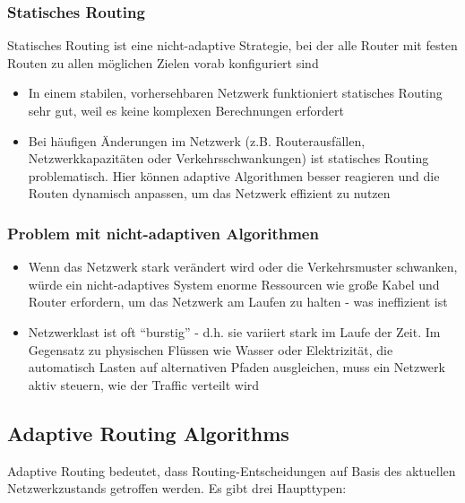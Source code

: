 \subsubsection*{Statisches Routing}
Statisches Routing ist eine nicht-adaptive Strategie, bei der alle Router mit festen Routen zu allen möglichen Zielen vorab konfiguriert sind
\begin{itemize}
    \item {} In einem stabilen, vorhersehbaren Netzwerk funktioniert statisches Routing sehr gut, weil es keine komplexen Berechnungen erfordert
    \item {} Bei häufigen Änderungen im Netzwerk (z.B. Routerausfällen, Netzwerkkapazitäten oder Verkehrsschwankungen) ist statisches Routing problematisch. Hier können adaptive Algorithmen besser reagieren und die Routen dynamisch anpassen, um das Netzwerk effizient zu nutzen
\end{itemize}
\subsubsection*{Problem mit nicht-adaptiven Algorithmen}
\begin{itemize}
    \item Wenn das Netzwerk stark verändert wird oder die Verkehrsmuster schwanken, würde ein nicht-adaptives System enorme Ressourcen wie große Kabel und Router erfordern, um das Netzwerk am Laufen zu halten - was ineffizient ist
    \item Netzwerklast ist oft \enquote{burstig} - d.h. sie variiert stark im Laufe der Zeit. Im Gegensatz zu physischen Flüssen wie Wasser oder Elektrizität, die automatisch Lasten auf alternativen Pfaden ausgleichen, muss ein Netzwerk aktiv steuern, wie der Traffic verteilt wird
\end{itemize}
\subsection{Adaptive Routing Algorithms}
Adaptive Routing bedeutet, dass Routing-Entscheidungen auf Basis des aktuellen Netzwerkzustands getroffen werden. Es gibt drei Haupttypen:
